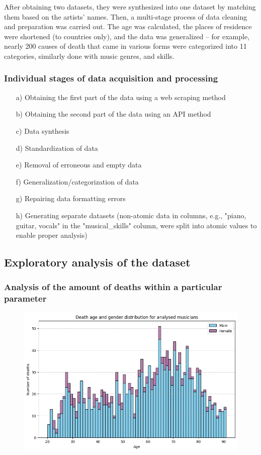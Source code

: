 \documentclass{article}
\begin{document}
After obtaining two datasets, they were synthesized into one dataset by matching them based on the artists' names. Then, a multi-stage process of data cleaning and preparation was carried out. The age was calculated, the places of residence were shortened (to countries only), and the data was generalized – for example, nearly 200 causes of death that came in various forms were categorized into 11 categories, similarly done with music genres, and skills.


\subsubsection{Individual stages of data acquisition and processing}
\begin{enumerate}
\item[a)] Obtaining the first part of the data using a web scraping method
\item[b)] Obtaining the second part of the data using an API method
\item[c)] Data synthesis
\item[d)] Standardization of data
\item[e)] Removal of erroneous and empty data
\item[f)] Generalization/categorization of data
\item[g)] Repairing data formatting errors
\item[h)] Generating separate datasets (non-atomic data in columns, e.g., "piano, guitar, vocals" in the "musical\_skills" column, were split into atomic values to enable proper analysis)
\end{enumerate}



\clearpage
\subsection{Exploratory analysis of the dataset}


\subsubsection{Analysis of the amount of deaths within a particular parameter}

\begin{figure}[H]
    \centering
    \includegraphics[width=0.8\linewidth]{graph_images/exploratory_analysis/age_gender.png}
    \label{fig:enter-label}
\end{figure}
\end{document}
